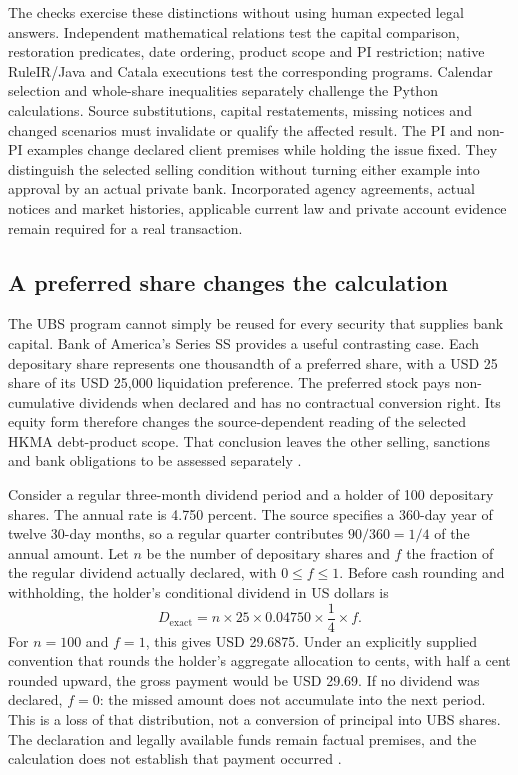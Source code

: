 \documentclass[12pt,a4paper,oneside,openany]{book}
\begin{document}
The checks exercise these distinctions without using human expected legal
answers. Independent mathematical relations test the capital comparison,
restoration predicates, date ordering, product scope and PI restriction;
native RuleIR/Java and Catala executions test the corresponding programs.
Calendar selection and whole-share inequalities separately challenge the
Python calculations. Source substitutions, capital restatements, missing
notices and changed scenarios must invalidate or qualify the affected result.
The PI and non-PI examples change declared client premises while holding the
issue fixed. They distinguish the selected selling condition without turning
either example into approval by an actual private bank. Incorporated agency
agreements, actual notices and market histories, applicable current law and
private account evidence remain required for a real transaction.

\subsection{A preferred share changes the calculation}
\label{sec:preferred-evidence}

The UBS program cannot simply be reused for every security that supplies bank
capital. Bank of America's Series SS provides a useful contrasting case.
Each depositary share represents one thousandth of a preferred share, with a
USD 25 share of its USD 25,000 liquidation preference. The preferred stock
pays non-cumulative dividends when declared and has no contractual conversion
right. Its equity form therefore changes the source-dependent reading of the
selected HKMA debt-product scope. That conclusion leaves the other selling,
sanctions and bank obligations to be assessed separately
\citep[pp.~S-16--S-17, S-22, S-27]{bofass2022}.

Consider a regular three-month dividend period and a holder of 100 depositary
shares. The annual rate is 4.750 percent. The source specifies a 360-day year
of twelve 30-day months, so a regular quarter contributes $90/360=1/4$ of the
annual amount. Let $n$ be the number of depositary shares and $f$ the fraction
of the regular dividend actually declared, with $0\leq f\leq1$. Before cash
rounding and withholding, the holder's conditional dividend in US dollars is
\begin{equation}
  D_{\mathrm{exact}}=n\times25\times0.04750\times\frac14\times f.
  \label{eq:ss-regular-dividend}
\end{equation}
For $n=100$ and $f=1$, this gives USD 29.6875. Under an explicitly supplied
convention that rounds the holder's aggregate allocation to cents, with half
a cent rounded upward, the gross payment would be USD 29.69. If no dividend
was declared, $f=0$: the missed amount does not accumulate into the next
period. This is a loss of that distribution, not a conversion of principal
into UBS shares. The declaration and legally available funds remain factual
premises, and the calculation does not establish that payment occurred
\citep[pp.~S-17, S-27]{bofass2022}.
\end{document}
